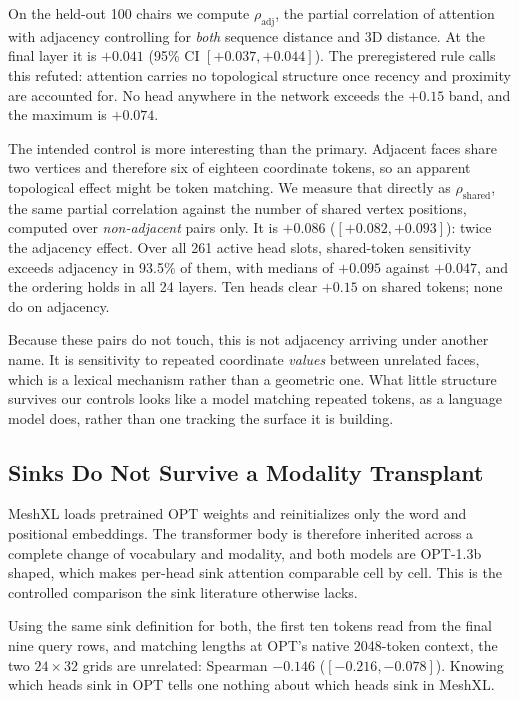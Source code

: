 \documentclass[conference]{IEEEtran}
\begin{document}
On the held-out 100 chairs we compute $\rho_{\text{adj}}$, the partial correlation
of attention with adjacency controlling for \emph{both} sequence distance and 3D
distance. At the final layer it is $+0.041$ (95\% CI $[+0.037, +0.044]$). The
preregistered rule calls this refuted: attention carries no topological structure
once recency and proximity are accounted for. No head anywhere in the network
exceeds the $+0.15$ band, and the maximum is $+0.074$.

The intended control is more interesting than the primary. Adjacent faces share
two vertices and therefore six of eighteen coordinate tokens, so an apparent
topological effect might be token matching. We measure that directly as
$\rho_{\text{shared}}$, the same partial correlation against the number of shared
vertex positions, computed over \emph{non-adjacent} pairs only. It is $+0.086$
($[+0.082, +0.093]$): twice the adjacency effect. Over all 261 active head slots,
shared-token sensitivity exceeds adjacency in 93.5\% of them, with medians of
$+0.095$ against $+0.047$, and the ordering holds in all 24 layers. Ten heads
clear $+0.15$ on shared tokens; none do on adjacency.

Because these pairs do not touch, this is not adjacency arriving under another
name. It is sensitivity to repeated coordinate \emph{values} between unrelated
faces, which is a lexical mechanism rather than a geometric one. What little
structure survives our controls looks like a model matching repeated tokens, as a
language model does, rather than one tracking the surface it is building.

\subsection{Sinks Do Not Survive a Modality Transplant}
\label{sec:e3}

MeshXL loads pretrained OPT weights and reinitializes only the word and positional
embeddings. The transformer body is therefore inherited across a complete change
of vocabulary and modality, and both models are OPT-1.3b shaped, which makes
per-head sink attention comparable cell by cell. This is the controlled comparison
the sink literature otherwise lacks.

Using the same sink definition for both, the first ten tokens read from the final
nine query rows, and matching lengths at OPT's native 2048-token context, the two
$24 \times 32$ grids are unrelated: Spearman $-0.146$ ($[-0.216, -0.078]$).
Knowing which heads sink in OPT tells one nothing about which heads sink in
MeshXL.
\end{document}

